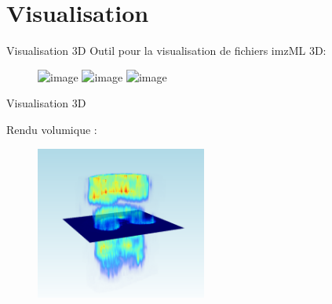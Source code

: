 \documentclass[10pt]{beamer}
\begin{document}
\section{Visualisation}


\begin{frame}{Visualisation 3D}
  Outil pour la visualisation de fichiers imzML 3D:

  \begin{figure}[ht]
    \centering
    \includegraphics<1>[width=0.95\textwidth]{fig/visu}%
    \includegraphics<2>[width=0.95\textwidth]{fig/visu2}%
    \includegraphics<3>[width=0.95\textwidth]{fig/visu3}
    \caption{}
    \label{fig:visu}
  \end{figure}

\end{frame}

\begin{frame}{Visualisation 3D}
  
  Rendu volumique :
  \begin{figure}[ht]
    \centering
    \includegraphics[width=0.5\textwidth]{fig/visu_3d.png}
    \caption{}
    \label{fig:visu_3d.png}
  \end{figure}

\end{frame}
\end{document}
